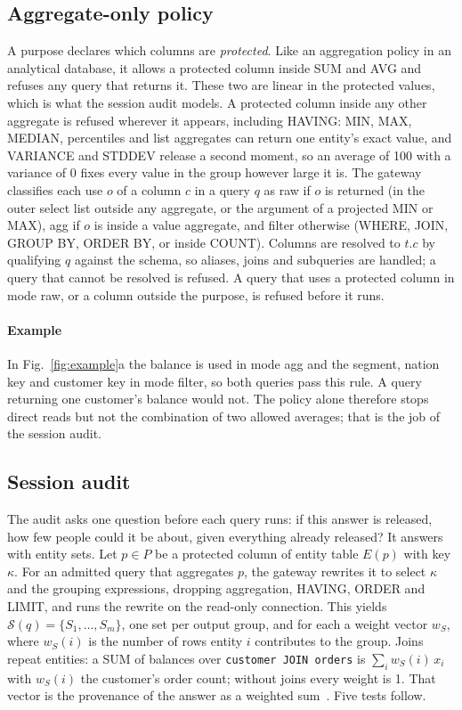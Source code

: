 \documentclass[sigconf,nonacm]{acmart}
\begin{document}
\subsection{Aggregate-only policy}\label{sec:policy}
A purpose declares which columns are \emph{protected}. Like an aggregation policy in an analytical database, it allows a protected column inside SUM and AVG and refuses any query that returns it. These two are linear in the protected values, which is what the session audit models. A protected column inside any other aggregate is refused wherever it appears, including HAVING: MIN, MAX, MEDIAN, percentiles and list aggregates can return one entity's exact value, and VARIANCE and STDDEV release a second moment, so an average of 100 with a variance of 0 fixes every value in the group however large it is. The gateway classifies each use $o$ of a column $c$ in a query $q$ as \textsf{raw} if $o$ is returned (in the outer select list outside any aggregate, or the argument of a projected MIN or MAX), \textsf{agg} if $o$ is inside a value aggregate, and \textsf{filter} otherwise (WHERE, JOIN, GROUP BY, ORDER BY, or inside COUNT). Columns are resolved to $t.c$ by qualifying $q$ against the schema, so aliases, joins and subqueries are handled; a query that cannot be resolved is refused. A query that uses a protected column in mode \textsf{raw}, or a column outside the purpose, is refused before it runs.

\paragraph{Example} In Fig.~\ref{fig:example}a the balance is used in mode \textsf{agg} and the segment, nation key and customer key in mode \textsf{filter}, so both queries pass this rule. A query returning one customer's balance would not. The policy alone therefore stops direct reads but not the combination of two allowed averages; that is the job of the session audit.

\subsection{Session audit}\label{sec:audit}
The audit asks one question before each query runs: if this answer is released, how few people could it be about, given everything already released? It answers with entity sets. Let $p\in P$ be a protected column of entity table $E(p)$ with key $\kappa$. For an admitted query that aggregates $p$, the gateway rewrites it to select $\kappa$ and the grouping expressions, dropping aggregation, HAVING, ORDER and LIMIT, and runs the rewrite on the read-only connection. This yields $\mathcal{S}(q)=\{S_1,\dots,S_m\}$, one set per output group, and for each a weight vector $w_S$, where $w_S(i)$ is the number of rows entity $i$ contributes to the group. Joins repeat entities: a SUM of balances over \texttt{customer JOIN orders} is $\sum_i w_S(i)\,x_i$ with $w_S(i)$ the customer's order count; without joins every weight is 1. That vector is the provenance of the answer as a weighted sum~\cite{green2007provenance}. Five tests follow.
\end{document}
